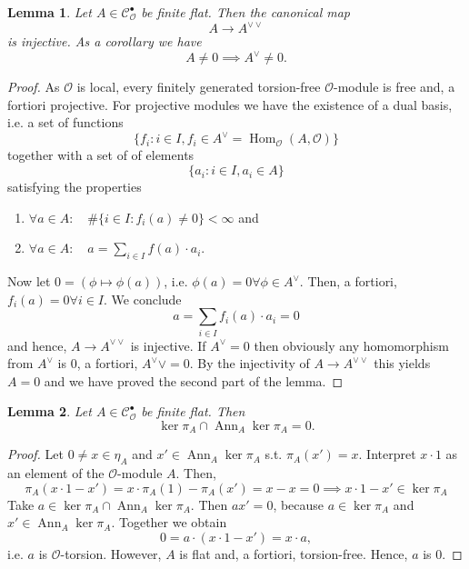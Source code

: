 \documentclass{article}
\theoremstyle{plain}%
\newtheorem{lemma}{Lemma}[section]
\theoremstyle{definition}
\theoremstyle{remark}
\newcommand{\cob}{\mathcal{C}_\mathcal{O}^\bullet}
\newcommand{\ann}{\operatorname{Ann}}
\renewcommand{\hom}{\operatorname{Hom}}
\begin{document}
\begin{lemma}\label{lem:pontryagininjectivity}
    Let \(A \in \cob\) be finite flat. Then the canonical map
    \[
        A \to A^{\vee\vee}
    \]
    is injective. As a corollary we have
    \[
        A \neq 0 \implies A^\vee \neq 0.  
    \]
\end{lemma}
\begin{proof}
    As \(\mathcal{O}\) is local, every finitely generated torsion-free \(\mathcal{O}\)-module is free and, 
    a fortiori projective. For projective modules we have the existence of a dual basis, i.e. a set of functions
    \[
        \{f_i \colon i \in I, f_i \in A^\vee = \hom_\mathcal{O}(A, \mathcal{O})\}  
    \]
    together with a set of of elements
    \[
        \{a_i \colon i \in I, a_i \in A\}  
    \]
    satisfying the properties
    \begin{enumerate}
        \item \(\forall a \in A\colon \quad \# \{i\in I\colon f_i(a) \neq 0\} < \infty\) and
        \item \(\forall a \in A\colon \quad a = \sum_{i \in I} f(a)\cdot a_i\).
    \end{enumerate}
    Now let \(0 = (\phi \mapsto \phi(a))\), i.e. \(\phi(a) = 0 \forall \phi \in A^\vee\).
    Then, a fortiori, \(f_i(a) = 0 \forall i \in I\).
    We conclude
    \[
        a = \sum_{i \in I} f_i(a)\cdot a_i = 0
    \]
    and hence, \(A \to A^{\vee\vee}\) is injective. If \(A^\vee = 0\) then obviously any homomorphism from \(A^\vee\)
    is \(0\), a fortiori, \(A^\vee\vee = 0\). By the injectivity of \(A \to A^{\vee\vee}\) this yields \(A = 0\)
    and we have proved the second part of the lemma.
\end{proof}

\begin{lemma}\label{lem:intersectionzero}
    Let \(A \in \cob\) be finite flat. Then
    \[
        \ker \pi_A \cap \ann_A \ker \pi_A = 0.  
    \]
\end{lemma}
\begin{proof}
    Let \(0 \neq x \in \eta_A\) and \(x' \in \ann_A \ker \pi_A\) s.t. \(\pi_A(x') = x\).
    Interpret \(x \cdot 1\) as an element of the \(\mathcal{O}\)-module \(A\). Then,
    \[
        \pi_A(x \cdot 1 - x') = x\cdot \pi_A(1) - \pi_A(x') = x - x = 0 \implies x \cdot 1 - x' \in \ker \pi_A
    \]
    Take \(a \in \ker \pi_A \cap \ann_A \ker \pi_A\). Then \(ax' = 0\), because \(a\in \ker \pi_A\) 
    and \(x' \in \ann_A \ker \pi_A\). Together we obtain
    \[
        0 = a \cdot (x\cdot 1 - x') = x \cdot a,
    \]
    i.e. \(a\) is \(\mathcal{O}\)-torsion. However, \(A\) is flat and, a fortiori, torsion-free. Hence,
    \(a\) is 0.
\end{proof}
\end{document}

